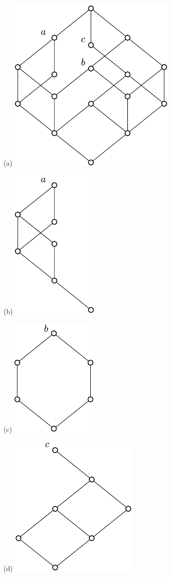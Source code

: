 \documentclass[11pt,a4paper,oneside,titlepage]{alb-latex}
\begin{document}
\begin{description}
  \begin{figure}[!t]
    \begin{albShelve}[b]
    \item[(a)] \includegraphics{down-closure-source.pdf}
    \item[(b)] \includegraphics{down-closure-of-a.pdf}
    \item[(c)] \includegraphics{down-closure-of-b.pdf}
    \item[(d)] \includegraphics{down-closure-of-c.pdf}

\end{albShelve}
\end{figure}
\end{description}
\end{document}
